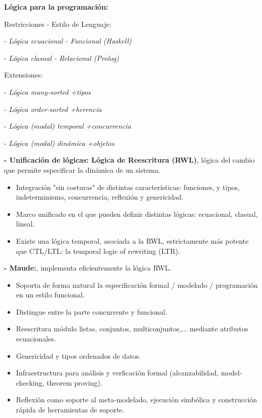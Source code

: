 \documentclass[12pt]{amsart}
\begin{document}
    \textbf{Lógica para la programación:}

    Restricciones - Estilo de Lenguaje: 
    
    - \emph{Lógica ecuacional - Funcional (Haskell)}
    
    - \emph{Lógica clasual - Relacional (Prolog)}
    
    Extensiones: 
    
    - \emph{Lógica many-sorted +tipos}

    - \emph{Lógica order-sorted +herencia}

    - \emph{Lógica (modal) temporal +concurrencia}

    - \emph{Lógica (modal) dinámica +objetos}
    
    \textbf{- Unificación de lógicas: Lógica de Reescritura (RWL)}, 
    lógica del cambio que permite especificar la dinámica de un
    sistema. 
    
    \begin{itemize}
    
    \item  Integración "sin costuras" de distintas características: funciones,
    y tipos, indeterminismo, concurrencia, reflexión y genericidad.
    
    \item  Marco unificado en el que pueden definir distintas lógicas: ecuacional, clasual, lineal.
    
    \item  Existe una lógica temporal, asociada a la RWL, estrictamente
    más potente que CTL/LTL: la temporal logic of rewriting (LTR).
    
    \end{itemize}
    
    \textbf{- Maude:}, implementa eficientemente la lógica
    RWL.  
     \begin{itemize}
    
        \item Soporta de forma natural la especificación formal / modelado
        / programación en un estilo funcional.
        
        \item  Distingue entre la parte concurrente y funcional.
        
        \item  Reescritura módulo listas, conjuntos, multiconjuntos,...
        mediante atributos ecuacionales.

        \item Genericidad y tipos ordenados de datos.

        \item Infraestructura para análisis y verficación formal
        (alcanzabilidad, model-checking, theorem proving).

        \item Reflexión como soporte al meta-modelado, ejecución
        simbólica y construcción rápida de herramientas de soporte.
        
        \end{itemize}
    \pagebreak
\end{document}

